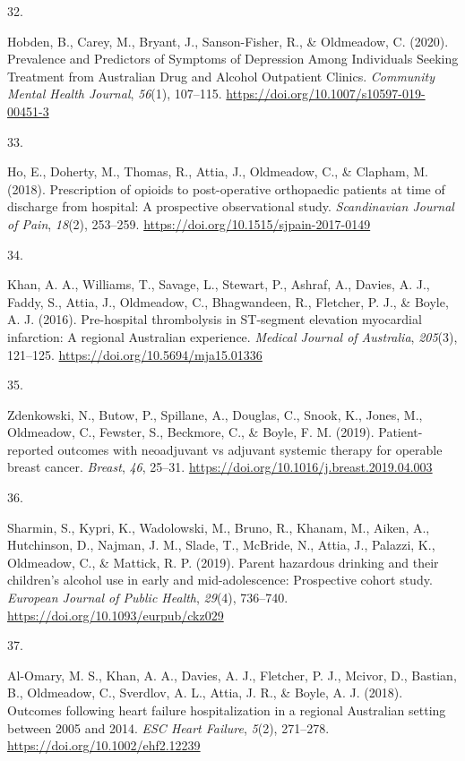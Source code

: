 \documentclass[11pt, a4paper]{awesome-cv}
\newlength{\csllabelwidth}
\newcommand{\CSLLeftMargin}[1]{\parbox[t]{\csllabelwidth}{#1}}
\newcommand{\CSLRightInline}[1]{\parbox[t]{\linewidth - \csllabelwidth}{#1}}
\begin{document}
\leavevmode\hypertarget{ref-hobden_prevalence_2020}{}%
\CSLLeftMargin{32. }
\CSLRightInline{Hobden, B., Carey, M., Bryant, J., Sanson-Fisher, R., \&
Oldmeadow, C. (2020). Prevalence and Predictors of Symptoms of
Depression Among Individuals Seeking Treatment from Australian Drug and
Alcohol Outpatient Clinics. \emph{Community Mental Health Journal},
\emph{56}(1), 107--115.
\url{https://doi.org/10.1007/s10597-019-00451-3}}

\leavevmode\hypertarget{ref-ho_prescription_2018}{}%
\CSLLeftMargin{33. }
\CSLRightInline{Ho, E., Doherty, M., Thomas, R., Attia, J., Oldmeadow,
C., \& Clapham, M. (2018). Prescription of opioids to post-operative
orthopaedic patients at time of discharge from hospital: A prospective
observational study. \emph{Scandinavian Journal of Pain}, \emph{18}(2),
253--259. \url{https://doi.org/10.1515/sjpain-2017-0149}}

\leavevmode\hypertarget{ref-khan_pre-hospital_2016}{}%
\CSLLeftMargin{34. }
\CSLRightInline{Khan, A. A., Williams, T., Savage, L., Stewart, P.,
Ashraf, A., Davies, A. J., Faddy, S., Attia, J., Oldmeadow, C.,
Bhagwandeen, R., Fletcher, P. J., \& Boyle, A. J. (2016). Pre-hospital
thrombolysis in ST-segment elevation myocardial infarction: A regional
Australian experience. \emph{Medical Journal of Australia},
\emph{205}(3), 121--125. \url{https://doi.org/10.5694/mja15.01336}}

\leavevmode\hypertarget{ref-zdenkowski_patient-reported_2019}{}%
\CSLLeftMargin{35. }
\CSLRightInline{Zdenkowski, N., Butow, P., Spillane, A., Douglas, C.,
Snook, K., Jones, M., Oldmeadow, C., Fewster, S., Beckmore, C., \&
Boyle, F. M. (2019). Patient-reported outcomes with neoadjuvant vs
adjuvant systemic therapy for operable breast cancer. \emph{Breast},
\emph{46}, 25--31. \url{https://doi.org/10.1016/j.breast.2019.04.003}}

\leavevmode\hypertarget{ref-sharmin_parent_2019}{}%
\CSLLeftMargin{36. }
\CSLRightInline{Sharmin, S., Kypri, K., Wadolowski, M., Bruno, R.,
Khanam, M., Aiken, A., Hutchinson, D., Najman, J. M., Slade, T.,
McBride, N., Attia, J., Palazzi, K., Oldmeadow, C., \& Mattick, R. P.
(2019). Parent hazardous drinking and their children's alcohol use in
early and mid-adolescence: Prospective cohort study. \emph{European
Journal of Public Health}, \emph{29}(4), 736--740.
\url{https://doi.org/10.1093/eurpub/ckz029}}

\leavevmode\hypertarget{ref-al-omary_outcomes_2018}{}%
\CSLLeftMargin{37. }
\CSLRightInline{Al-Omary, M. S., Khan, A. A., Davies, A. J., Fletcher,
P. J., Mcivor, D., Bastian, B., Oldmeadow, C., Sverdlov, A. L., Attia,
J. R., \& Boyle, A. J. (2018). Outcomes following heart failure
hospitalization in a regional Australian setting between 2005 and 2014.
\emph{ESC Heart Failure}, \emph{5}(2), 271--278.
\url{https://doi.org/10.1002/ehf2.12239}}
\end{document}
